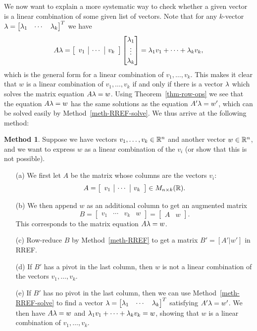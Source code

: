 \documentclass[reqno]{amsart}
\theoremstyle{definition}
\newtheorem{method}[theorem]{Method}
\begin{document}
We now want to explain a more systematic way to check whether a given
vector is a linear combination of some given list of vectors.
Note that for any $k$-vector
$\lambda=\left[\begin{matrix}\lambda_1 & \dotsb & \lambda_k\end{matrix}\right]^T$ we have
\[ A\lambda =
    \left[\begin{array}{c|c|c}
     v_1 & \cdots & v_k
    \end{array}\right]
    \left[\begin{matrix} \lambda_1 \\ \vdots \\ \lambda_k \end{matrix}\right] =
    \lambda_1 v_1 + \dotsb + \lambda_k v_k,
\]
which is the general form for a linear combination of
$v_1,\dotsc,v_k$.  This makes it clear that $w$ is a linear
combination of $v_1,\dotsc,v_k$ if and only if there is a vector $\lambda$
which solves the matrix equation $A\lambda=w$.  Using
Theorem~\ref{thm-row-ops} we see that the equation $A\lambda=w$ has the
same solutions as the equation $A'\lambda=w'$, which can be solved easily
by Method~\ref{meth-RREF-solve}.  We thus arrive at the following
method: 

\begin{method}\label{meth-find-lincomb}
 Suppose we have vectors $v_1,\dotsc,v_k\in{\mathbb{R}}^n$ and another vector
 $w\in{\mathbb{R}}^n$, and we want to express $w$ as a linear combination of the
 $v_i$ (or show that this is not possible).
 \begin{itemize}
  \item[(a)] We first let $A$ be the matrix whose columns are the
   vectors $v_i$:
   \[ A = \left[\begin{array}{c|c|c}
       v_1 & \cdots & v_k
      \end{array}\right] \in M_{n\times k}({\mathbb{R}}).
   \]
  \item[(b)] We then append $w$ as an additional column to get an
   augmented matrix
   \[ B  = \left[\begin{array}{c|c|c|c}
       v_1 & \cdots & v_k & w
      \end{array}\right]
       = \left[\begin{array}{c|c} A & w\end{array}\right].
   \]
   This corresponds to the matrix equation $A\lambda=w$.
  \item[(c)] Row-reduce $B$ by Method~\ref{meth-RREF} to get a matrix
   $B'=[A'|w']$ in RREF.
  \item[(d)] If $B'$ has a pivot in the last column, then $w$ is not a
   linear combination of the vectors $v_1,\dotsc,v_k$.
  \item[(e)] If $B'$ has no pivot in the last column, then we can use
   Method~\ref{meth-RREF-solve} to find a vector
   $\lambda=\left[\begin{matrix}\lambda_1 & \cdots & \lambda_k\end{matrix}\right]^T$ satisfying $A'\lambda=w'$.  We
   then have $A\lambda=w$ and $\lambda_1v_1+\dotsb+\lambda_kv_k=w$, showing that
   $w$ is a linear combination of $v_1,\dotsc,v_k$.
 \end{itemize}
\end{method}
\end{document}
